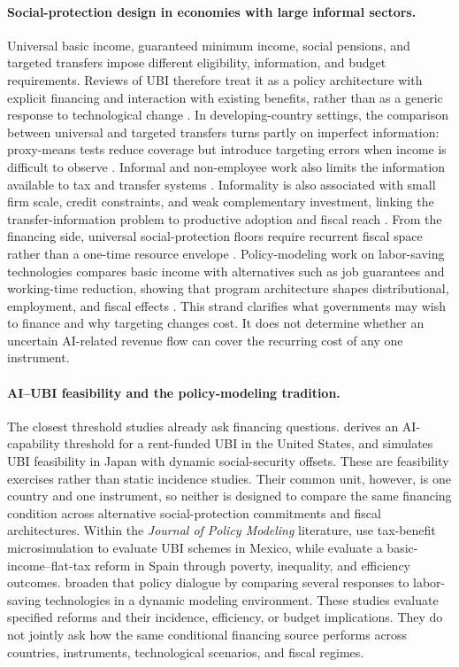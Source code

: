 \paragraph{Social-protection design in economies with large informal sectors.}
Universal basic income, guaranteed minimum income, social pensions, and targeted transfers impose different eligibility, information, and budget requirements. Reviews of UBI therefore treat it as a policy architecture with explicit financing and interaction with existing benefits, rather than as a generic response to technological change \citep{gentilini2020ubi,oecd2017basicincome}. In developing-country settings, the comparison between universal and targeted transfers turns partly on imperfect information: proxy-means tests reduce coverage but introduce targeting errors when income is difficult to observe \citep{hanna2018universal}. Informal and non-employee work also limits the information available to tax and transfer systems \citep{jensen2022employment}. Informality is also associated with small firm scale, credit constraints, and weak complementary investment, linking the transfer-information problem to productive adoption and fiscal reach \citep{worldbank2021informality}. From the financing side, universal social-protection floors require recurrent fiscal space rather than a one-time resource envelope \citep{cattaneo2024financing}. Policy-modeling work on labor-saving technologies compares basic income with alternatives such as job guarantees and working-time reduction, showing that program architecture shapes distributional, employment, and fiscal effects \citep{dalessandro2025exploring}. This strand clarifies what governments may wish to finance and why targeting changes cost. It does not determine whether an uncertain AI-related revenue flow can cover the recurring cost of any one instrument.

\paragraph{AI--UBI feasibility and the policy-modeling tradition.}
The closest threshold studies already ask financing questions. \citet{nayebi2025threshold} derives an AI-capability threshold for a rent-funded UBI in the United States, and \citet{ito2026ubi} simulates UBI feasibility in Japan with dynamic social-security offsets. These are feasibility exercises rather than static incidence studies. Their common unit, however, is one country and one instrument, so neither is designed to compare the same financing condition across alternative social-protection commitments and fiscal architectures. Within the \emph{Journal of Policy Modeling} literature, \citet{caamal2022ubi} use tax-benefit microsimulation to evaluate UBI schemes in Mexico, while \citet{lara2026basic} evaluate a basic-income--flat-tax reform in Spain through poverty, inequality, and efficiency outcomes. \citet{dalessandro2025exploring} broaden that policy dialogue by comparing several responses to labor-saving technologies in a dynamic modeling environment. These studies evaluate specified reforms and their incidence, efficiency, or budget implications. They do not jointly ask how the same conditional financing source performs across countries, instruments, technological scenarios, and fiscal regimes.

